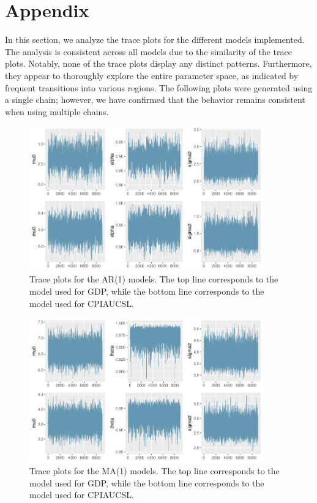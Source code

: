 \section{Appendix}
In this section, we analyze the trace plots for the different models implemented. The analysis is consistent across all models due to the similarity of the trace plots. Notably, none of the trace plots display any distinct patterns. Furthermore, they appear to thoroughly explore the entire parameter space, as indicated by frequent transitions into various regions. The following plots were generated using a single chain; however, we have confirmed that the behavior remains consistent when using multiple chains.
\begin{figure}[H]
    \centering
    \includegraphics[width=0.9\textwidth]{images/2-AR/traceplots.png}
    \caption{Trace plots for the AR(1) models. The top line corresponds to the model used for GDP, while the bottom line corresponds to the model used for CPIAUCSL.}
\end{figure}
\begin{figure}[H]
    \centering
    \includegraphics[width=0.9\textwidth]{images/3-MA/traceplots.png}
    \caption{Trace plots for the MA(1) models. The top line corresponds to the model used for GDP, while the bottom line corresponds to the model used for CPIAUCSL.}
\end{figure}
